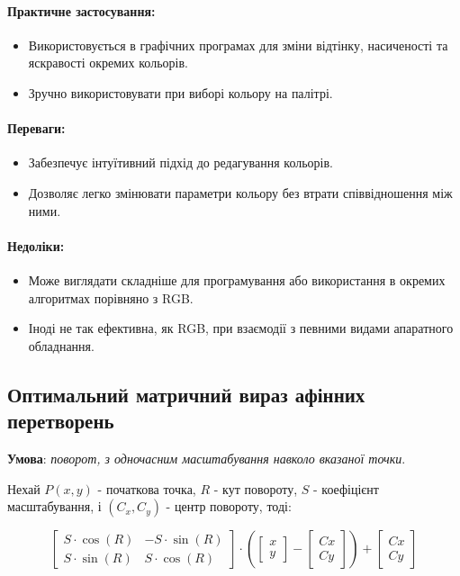 \documentclass[oneside,14pt]{extarticle}
\begin{document}
\begin{normalsize}
	\paragraph{Практичне застосування:}
	\begin{itemize}
		\item Використовується в графічних програмах для зміни відтінку, насиченості та яскравості окремих кольорів.
		\item Зручно використовувати при виборі кольору на палітрі.
	\end{itemize}
	
	\paragraph{Переваги:}
	\begin{itemize}
		\item Забезпечує інтуїтивний підхід до редагування кольорів.
		\item Дозволяє легко змінювати параметри кольору без втрати співвідношення між ними.
	\end{itemize}
	
	\paragraph{Недоліки:}
	\begin{itemize}
		\item Може виглядати складніше для програмування або використання в окремих алгоритмах порівняно з RGB.
		\item Іноді не так ефективна, як RGB, при взаємодії з певними видами апаратного обладнання.
	\end{itemize}
	
	\subsection{Оптимальний матричний вираз афінних перетворень}
	\textbf{Умова}: \textit{поворот, з одночасним масштабування навколо вказаної точки}.
	
	Нехай $P (x, y)$ - початкова точка, $R$ - кут повороту, $S$ - коефіцієнт масштабування, і $(C_x, C_y)$ - центр повороту, тоді:
	
	\[\begin{bmatrix} 
		S \cdot \cos(R) & -S \cdot \sin(R) \\
		S \cdot \sin(R) & S \cdot \cos(R) 
	\end{bmatrix} 
	\cdot
	\left(
	\begin{bmatrix} 
		x \\ 
		y 
	\end{bmatrix} -
	\begin{bmatrix} 
		Cx \\ 
		Cy 
	\end{bmatrix}\right) +
	\begin{bmatrix} 
		Cx \\ 
		Cy 
	\end{bmatrix} \]

\end{normalsize}
\end{document}
